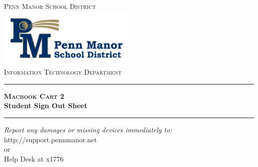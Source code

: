 \begin{titlepage}

\begin{center}

\textsc{\LARGE Penn Manor School District}\\[1.5cm]


\includegraphics[width=0.5\textwidth]{images/logo}\\[1cm]    


\textsc{\Large Information Technology Department}\\[0.5cm]


\hrule 
{ \huge \bfseries \textsc{Macbook Cart} 2\\ \vspace{0.5cm} Student Sign Out Sheet}\\[0.4cm]

\hrule 


\vfill
\begin{center} \large
\emph{Report any damages or missing devices immediately to:}\\
http://support.pennmanor.net \\or\\Help Desk at x1776
\end{center}

\vfill

\end{center}

\end{titlepage}